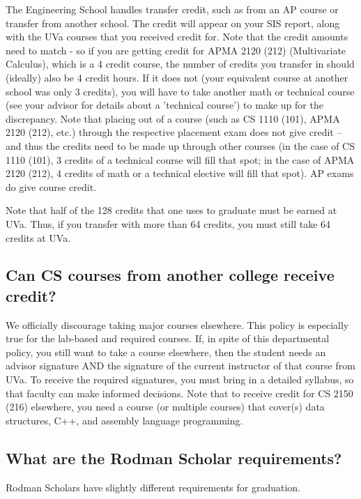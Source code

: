 \documentclass[10pt,letter]{book}
\begin{document}
The Engineering School handles transfer credit, such as from an AP
course or transfer from another school. The credit will appear on your
SIS report, along with the UVa courses that you received credit
for. Note that the credit amounts need to match - so if you are
getting credit for APMA 2120 (212) (Multivariate Calculus), which is a
4 credit course, the number of credits you transfer in should
(ideally) also be 4 credit hours. If it does not (your equivalent
course at another school was only 3 credits), you will have to take
another math or technical course (see your advisor for details about a
'technical course') to make up for the discrepancy. Note that placing
out of a course (such as CS 1110 (101), APMA 2120 (212), etc.) through
the respective placement exam does not give credit – and thus the
credits need to be made up through other courses (in the case of CS
1110 (101), 3 credits of a technical course will fill that spot; in
the case of APMA 2120 (212), 4 credits of math or a technical elective
will fill that spot). AP exams do give course credit.

Note that half of the 128 credits that one uses to graduate must be
earned at UVa. Thus, if you transfer with more than 64 credits, you
must still take 64 credits at UVa.

\subsection{Can CS courses from another college receive credit?}

We officially discourage taking major courses elsewhere. This policy
is especially true for the lab-based and required courses. If, in
spite of this departmental policy, you still want to take a course
elsewhere, then the student needs an advisor signature AND the
signature of the current instructor of that course from UVa. To
receive the required signatures, you must bring in a detailed
syllabus, so that faculty can make informed decisions. Note that to
receive credit for CS 2150 (216) elsewhere, you need a course (or
multiple courses) that cover(s) data structures, C++, and assembly
language programming.

\subsection{What are the Rodman Scholar requirements?}

Rodman Scholars have slightly different requirements for graduation.
\end{document}

